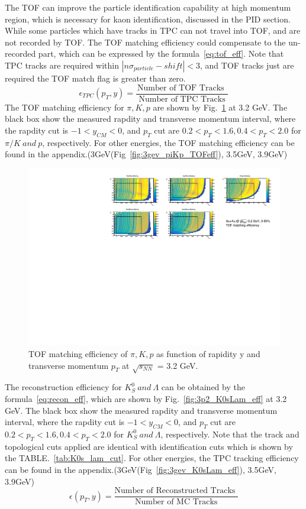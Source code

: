 The TOF can improve the particle identification capability at high momentum region, 
which is necessary for kaon identification, discussed in the PID section.
While some particles which have tracks in TPC can not travel into TOF, and are not recorded by TOF.
The TOF matching efficiency could compensate to the un-recorded part, 
which can be expressed by the formula~\ref{eq:tof_eff}. Note that TPC tracks are required within $|n\sigma_{particle}-shift|<3$,
and TOF tracks just are required the TOF match flag is greater than zero.
\begin{equation}
    \epsilon_{TPC}\left(p_T, y\right)=\frac{\text {Number of TOF Tracks }}{\text { Number of TPC Tracks }}
\label{eq:tof_eff}
\end{equation}
The TOF matching efficiency for $\pi, K, p$ are shown by Fig.~\ref{fig:3p2_piKp_TOFeff} at 3.2 GeV. 
The black box show the measured rapdity and transverse momentum interval, where the rapdity cut is $-1<y_{CM}<0$, 
and $p_T$ cut are $0.2<p_T<1.6, 0.4<p_T<2.0$ for $\pi/K ~and~ p$, respectively. 
For other energies, the TOF matching efficiency can be found in the appendix.(3GeV(Fig~\ref{fig:3gev_piKp_TOFeff}), 3.5GeV, 3.9GeV)
\begin{figure}[hbt!]
\centering
\includegraphics[width=0.65\linewidth]{figures/chapter02/3p2gev_TOF_eff.pdf}
\caption{TOF matching efficiency of $\pi, K, p$ as function of rapidity y and transverse momentum $p_T$ at $\sqrt{s_{NN}}$ = 3.2 GeV.}
\label{fig:3p2_piKp_TOFeff}
\end{figure}

The reconstruction efficiency for $K^{0}_{S}~and~ \Lambda$ can be obtained by the formula~\ref{eq:recon_eff},
which are shown by Fig.~\ref{fig:3p2_K0sLam_eff} at 3.2 GeV. The black box show the measured rapdity and transverse momentum interval, 
where the rapdity cut is $-1<y_{CM}<0$, and $p_T$ cut are $0.2<p_T<1.6, 0.4<p_T<2.0$ for $K^{0}_{S}~and~ \Lambda$, respectively. 
Note that the track and topological cuts applied are identical with identification cuts which is shown by the TABLE.~\ref{tab:K0s_lam_cut}.
For other energies, the TPC tracking efficiency can be found in the appendix.(3GeV(Fig~\ref{fig:3gev_K0sLam_eff}), 3.5GeV, 3.9GeV)
\begin{equation}
    \epsilon\left(p_T, y\right)=\frac{\text {Number of Reconstructed Tracks }}{\text { Number of MC Tracks }}
\label{eq:recon_eff}
\end{equation}

